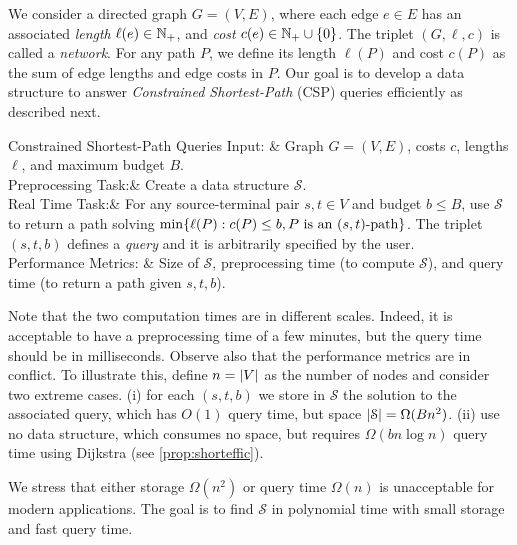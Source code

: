 We consider a directed graph $G=(V,E)$, where each edge $e\in E$ has an associated \emph{length} $\ell(e)\in\mathbb{N}_+$, and \emph{cost} $c(e)\in\mathbb{N}_+\cup\{0\}$.
The triplet $(G,\ell,c)$ is called a \emph{network}.
For any path $P$, we define its length $\ell(P)$ and cost $c(P)$ as the sum of edge lengths and edge costs in $P$. 
Our goal is to develop a data structure to answer \emph{Constrained Shortest-Path} (CSP) queries efficiently as described next.

\begin{problemdef}[framed]{Constrained Shortest-Path Queries}
	Input: & Graph $G=(V,E)$, costs $c$, lengths $\ell$, and maximum budget $B$.\\
	Preprocessing Task:& Create a data structure $\mathcal{S}$. \\
	Real Time Task:& For any source-terminal pair $s,t\in V$ and budget $b\leq B$, use $\mathcal{S}$ to return a path solving $\min\{\ell(P):c(P) \leq b, P \text{ is an } (s,t)\text{-path}\}$.
	The triplet $(s,t,b)$ defines a \emph{query} and it is arbitrarily specified by the user. \\
  	Performance Metrics: &  Size of $\mathcal{S}$, preprocessing time (to compute $\mathcal{S}$), and query time (to return a path given $s,t,b$). 
\end{problemdef}


Note that the two computation times are in different scales.
Indeed, it is acceptable to have a preprocessing time of a few minutes, but the query time should be in milliseconds.
Observe also that the performance metrics are in conflict.
To illustrate this, define $n=\lvert V\rvert$ as the number of nodes and consider two extreme cases.
(i) for each $(s,t,b)$ we store in $\mathcal{S}$ the solution to the associated query, which has $O(1)$ query time, but space $\lvert\mathcal{S}\rvert=\Omega(Bn^2)$.
(ii) use no data structure, which consumes no space, but requires $\Omega(bn\log n)$ query time using Dijkstra (see \cref{prop:shorteffic}).

We stress that either storage $\Omega(n^2)$ or query time $\Omega(n)$ is unacceptable for modern applications.
The goal is to find $\mathcal{S}$ in polynomial time with small storage and fast query time.

\medskip

